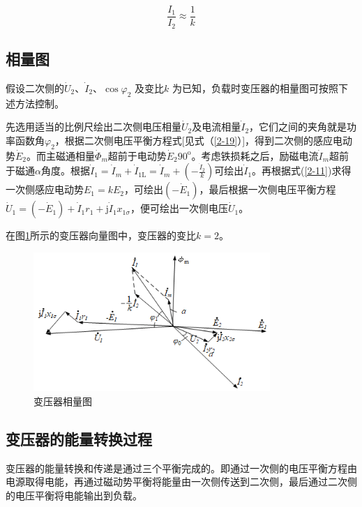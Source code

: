 \documentclass{book}
\begin{document}
\begin{equation}
\frac{{{I}_{1}}}{{{I}_{2}}}\approx \frac{1}{k}
\label{2-26}
\end{equation}


\subsection{相量图}
假设二次侧的${{\dot{U}}_{2}}$、${{\dot{I}}_{2}}$、$\cos {{\varphi }_{2}}$ 及变比$k$ 为已知，负载时变压器的相量图可按照下述方法控制。

先选用适当的比例尺绘出二次侧电压相量${{\dot{U}}_{2}}$及电流相量${{\dot{I}}_{2}}$，它们之间的夹角就是功率函数角${{\varphi }_{2}}$，根据二次侧电压平衡方程式[见式（\ref{2-19}）]，得到二次侧的感应电动势${{\dot{E}}_{2}}$。而主磁通相量${{\dot{\Phi }}_{m}}$超前于电动势${{\dot{E}}_{2}}{{90}^{\text{o}}}$。考虑铁损耗之后，励磁电流${{\dot{I}}_{m}}$超前于磁通$\alpha $角度。根据${{\dot{I}}_{1}}={{\dot{I}}_{m}}+{{\dot{I}}_{1\text{L}}}={{\dot{I}}_{m}}+\left( -\frac{{{{\dot{I}}}_{2}}}{k} \right)$可绘出${{\dot{I}}_{1}}$。再根据式(\ref{2-11})求得一次侧感应电动势${{E}_{1}}=k{{E}_{2}}$，可绘出$\left( -{{{\dot{E}}}_{1}} \right)$，最后根据一次侧电压平衡方程${{\dot{U}}_{1}}=\left( -{{{\dot{E}}}_{1}} \right)+{{\dot{I}}_{1}}{{r}_{1}}+\text{j}{{\dot{I}}_{1}}{{x}_{1\sigma }}$，便可绘出一次侧电压${{\dot{U}}_{1}}$。

在图\ref{fig_3.10}所示的变压器向量图中，变压器的变比$k=2$。

\begin{figure}[H]
	\centering
	\includegraphics[width=0.80\textwidth]{3-10g.png}
	\caption{变压器相量图}
	\label{fig_3.10}
\end{figure}

\subsection{变压器的能量转换过程}
变压器的能量转换和传递是通过三个平衡完成的。即通过一次侧的电压平衡方程由电源取得电能，再通过磁动势平衡将能量由一次侧传送到二次侧，最后通过二次侧的电压平衡将电能输出到负载。
\end{document}
